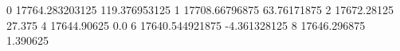 0 17764.283203125 119.376953125
1 17708.66796875 63.76171875
2 17672.28125 27.375
4 17644.90625 0.0
6 17640.544921875 -4.361328125
8 17646.296875 1.390625
